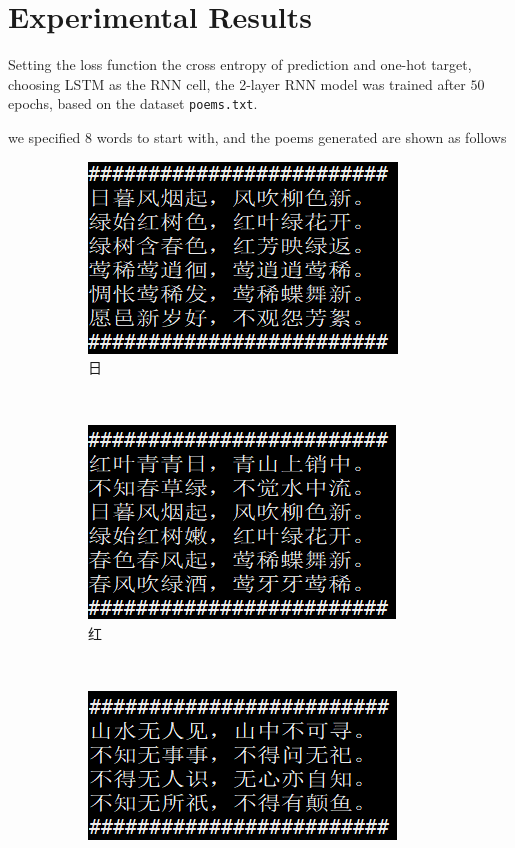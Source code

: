 \documentclass[10pt]{article}
\begin{document}
\section{Experimental Results}
Setting the loss function the cross entropy of prediction and one-hot target, choosing LSTM as the RNN cell, the 2-layer RNN model was trained after $50$ epochs, based on the dataset \texttt{poems.txt}.\par
we specified $8$ words to start with, and the poems generated are shown as follows
\begin{figure}[H]
\centering
\begin{subfigure}[t]{0.24\textwidth}
\centering
\includegraphics[scale=.65]{poems_1.png}
\caption{日}
\label{poems_1}
\end{subfigure}%
~
\begin{subfigure}[t]{0.23\textwidth}
\centering
\includegraphics[scale=.65]{poems_2.png}
\caption{红}
\label{poems_2}
\end{subfigure}
~
\begin{subfigure}[t]{0.23\textwidth}
\centering
\includegraphics[scale=.65]{poems_3.png}

\end{subfigure}
\end{figure}
\end{document}
